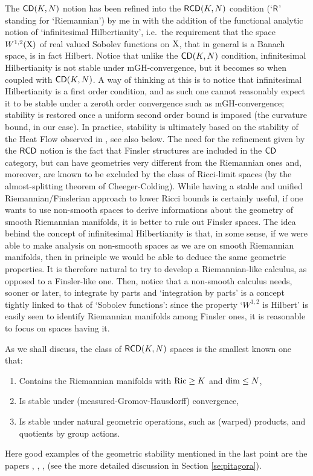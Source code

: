 \documentclass[11pt]{article}
\numberwithin{equation}{section}
\newcommand{\X}{{\rm X}}
\newcommand{\CD}{{\sf CD}}
\newcommand{\RCD}{{\sf RCD}}
\begin{document}
 The $\CD(K,N)$ notion  has been refined into the $\RCD(K,N)$ condition (`${\sf R}$' standing for `Riemannian') by me in \cite{Gigli12} with the addition of the functional analytic notion of `infinitesimal Hilbertianity', i.e.\ the requirement that the  space $W^{1,2}(\X)$ of real valued Sobolev functions on $\X$, that in general is a Banach space, is in fact Hilbert. Notice that unlike the $\CD(K,N)$ condition, infinitesimal Hilbertianity is not stable under mGH-convergence, but it becomes so when coupled with $\CD(K,N)$. A  way of thinking at this is to notice that infinitesimal Hilbertianity is a first order condition, and as such one cannot reasonably expect it to be stable under a zeroth order convergence such as mGH-convergence; stability is restored once a uniform second order bound is imposed (the curvature bound, in our case). In practice, stability is ultimately based on the stability of the Heat Flow observed in \cite{Gigli10}, see also below. The need for the refinement given by the $\RCD$ notion  is the fact that Finsler structures are included in the $\CD$ category, but can have geometries very different from the Riemannian ones and, moreover, are known to be excluded by the class of Ricci-limit spaces (by the almost-splitting theorem of Cheeger-Colding). While having a stable and unified Riemannian/Finslerian approach to lower Ricci bounds is certainly   useful, if one wants to use non-smooth spaces to derive informations about the geometry of smooth Riemannian manifolds, it is better to rule out Finsler spaces. The idea behind the concept of infinitesimal Hilbertianity is that, in some sense, if we were able to make analysis on non-smooth spaces as we are on smooth Riemannian manifolds, then in principle we would be able to deduce the same geometric properties. It is therefore natural to try to develop a Riemannian-like calculus, as opposed to a Finsler-like one. Then, notice that  a  non-smooth calculus needs, sooner or later, to integrate by parts and `integration by parts' is a concept tightly linked to that of `Sobolev functions': since the property `$W^{1,2}$ is Hilbert' is easily seen to identify Riemannian manifolds among Finsler ones, it is reasonable to focus on spaces having it. 
 
As we shall discuss, the class of $\RCD(K,N)$ spaces is the smallest known one that:
 \begin{enumerate}
  \item Contains the Riemannian manifolds with ${\rm Ric}\geq K$ and ${\rm dim}\leq N$,
  \item Is stable under (measured-Gromov-Hausdorff) convergence,
  \item Is stable under natural geometric operations, such as (warped) products, and quotients by group actions.  
  \end{enumerate}
Here good examples of the geometric stability mentioned in the last point are the papers \cite{AmbrosioGigliSavare12},  \cite{Erbar-Kuwada-Sturm13}, \cite{Ketterer13}, \cite{GKMS17} (see the more detailed discussion in Section \ref{se:pitagora}).
 
\end{document}
